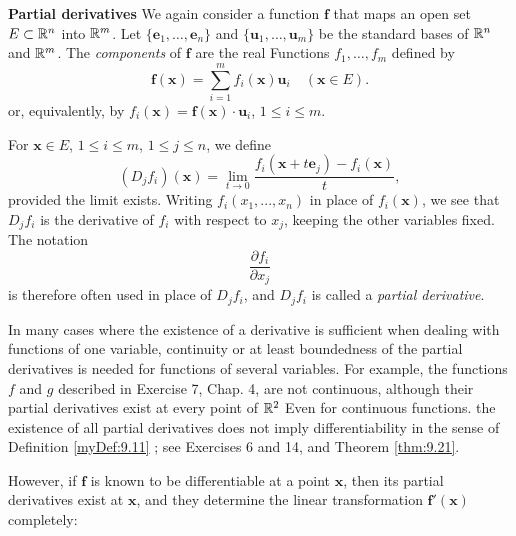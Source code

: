 
\begin{myDef}
    \label{myDef:9.16}
    \textbf{Partial derivatives}
    We again consider a function $\mathbf{f}$ that maps an open set $E \subset {\protect\mathbb R}^n$ into ${\protect\mathbb R}^m$.
    Let $\{\mathbf{e}_1, \dots, \mathbf{e}_n\}$
    and $\{\mathbf{u}_1, \dots, \mathbf{u}_m\}$ 
    be the standard bases of ${\protect\mathbb R}^n$ and ${\protect\mathbb R}^m$.
    The \emph{components} of $\mathbf{f}$ are the real Functions
    $f_1, \dots, f_m$ defined by 
    \begin{equation}
        \label{eq:9.24}
        \mathbf{f(x)} = 
        \sum_{i=1}^{m} f_i(\mathbf{x}) \mathbf{u}_i
        \quad 
        (\mathbf{x} \in E).
    \end{equation}
    or, equivalently, by $f_i(\mathbf{x}) = \mathbf{f(x)}\cdot \mathbf{u}_i$, $1 \leq i \leq m$.

    For $\mathbf{x} \in E$, $1 \leq i \leq m$, $1 \leq j \leq n$, we define 
    \begin{equation}
        \label{eq:9.25}
        (D_j f_i)(\mathbf{x}) =
        \lim_{t \to 0} \frac{f_i(\mathbf{x} + t \mathbf{e}_j) - f_i (\mathbf{x})}{t},
    \end{equation}
    provided the limit exists.
    Writing $f_i(x_1 , ... , x_n)$ in place of $f_i(\mathbf{x})$, we see that $D_j f_i$ is the derivative of $f_i$ with respect to $x_j$, keeping the other variables fixed.
    The notation
    \begin{equation}
        \label{eq:9.26}
        \frac{\partial f_i}{\partial x_j}
    \end{equation}
    is therefore often used in place of $D_j f_i$, 
    and $D_j f_i$ is called a \emph{partial derivative}.
\end{myDef}

In many cases where the existence of a derivative is sufficient when dealing
with functions of one variable, continuity or at least boundedness of the partial derivatives is needed for functions of several variables. 
For example, the functions $f$ and $g$ described in Exercise 7, Chap. 4, are not continuous, although their partial derivatives exist at every point of ${\protect\mathbb R}^2$ Even for continuous functions.
the existence of all partial derivatives does not imply differentiability in the sense
of Definition \ref{myDef:9.11} ; see Exercises 6 and 14, and Theorem \ref{thm:9.21}.

However, if $\mathbf{f}$ is known to be differentiable at a point $\mathbf{x}$, then its partial derivatives exist at $\mathbf{x}$, and they determine the linear transformation $\mathbf{f'(x)}$ completely:

